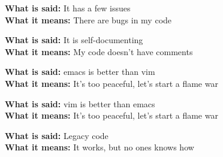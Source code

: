 \documentclass[9pt]{extarticle} %
\begin{document}
\begin{minipage}[t]{.61\linewidth}
\textbf{What is said:} It has a few issues \\
\textbf{What it means:} There are bugs in my code

\textbf{What is said:} It is self-documenting \\
\textbf{What it means:} My code doesn't have comments

\textbf{What is said:} emacs is better than vim \\
\textbf{What it means:} It's too peaceful, let's start a flame war

\textbf{What is said:} vim is better than emacs \\
\textbf{What it means:} It's too peaceful, let's start a flame war

\textbf{What is said:} Legacy code \\
\textbf{What it means:} It works, but no ones knows how

\end{minipage} %
\end{document}
